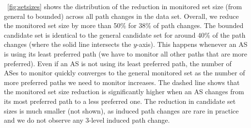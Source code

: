 \fig~\ref{fig:setsizes} shows the distribution of the reduction in
monitored set size (from general to bounded) across all path changes in
the data set.  Overall, we reduce the monitored set size by more than
50\% for 38\% of path changes.  The bounded candidate set is identical
to the general candidate set for around 40\% of the path changes (where
the solid line intersects the $y$-axis).  This happens whenever an AS is
using its least preferred path (\ie we have to monitor all other paths
that are more preferred).  Even if an AS is not using its least
preferred path, the number of ASes to monitor quickly converges to the
general monitored set as the number of more preferred paths we need to
monitor increases.  The dashed line shows that the monitored set size
reduction is significantly higher when an AS changes from its most
preferred path to a less preferred one.  The reduction in candidate set
sizes is much smaller (not shown), as induced path changes are rare in
practice and we do not observe any 3-level induced path change.
